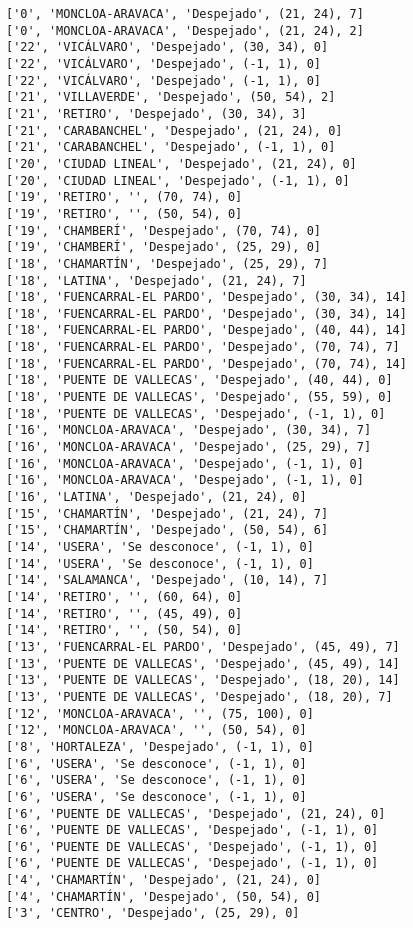 \documentclass[11pt]{article}
\begin{document}
\begin{Verbatim}[commandchars=\\\{\}]
['0', 'MONCLOA-ARAVACA', 'Despejado', (21, 24), 7]
['0', 'MONCLOA-ARAVACA', 'Despejado', (21, 24), 2]
['22', 'VICÁLVARO', 'Despejado', (30, 34), 0]
['22', 'VICÁLVARO', 'Despejado', (-1, 1), 0]
['22', 'VICÁLVARO', 'Despejado', (-1, 1), 0]
['21', 'VILLAVERDE', 'Despejado', (50, 54), 2]
['21', 'RETIRO', 'Despejado', (30, 34), 3]
['21', 'CARABANCHEL', 'Despejado', (21, 24), 0]
['21', 'CARABANCHEL', 'Despejado', (-1, 1), 0]
['20', 'CIUDAD LINEAL', 'Despejado', (21, 24), 0]
['20', 'CIUDAD LINEAL', 'Despejado', (-1, 1), 0]
['19', 'RETIRO', '', (70, 74), 0]
['19', 'RETIRO', '', (50, 54), 0]
['19', 'CHAMBERÍ', 'Despejado', (70, 74), 0]
['19', 'CHAMBERÍ', 'Despejado', (25, 29), 0]
['18', 'CHAMARTÍN', 'Despejado', (25, 29), 7]
['18', 'LATINA', 'Despejado', (21, 24), 7]
['18', 'FUENCARRAL-EL PARDO', 'Despejado', (30, 34), 14]
['18', 'FUENCARRAL-EL PARDO', 'Despejado', (30, 34), 14]
['18', 'FUENCARRAL-EL PARDO', 'Despejado', (40, 44), 14]
['18', 'FUENCARRAL-EL PARDO', 'Despejado', (70, 74), 7]
['18', 'FUENCARRAL-EL PARDO', 'Despejado', (70, 74), 14]
['18', 'PUENTE DE VALLECAS', 'Despejado', (40, 44), 0]
['18', 'PUENTE DE VALLECAS', 'Despejado', (55, 59), 0]
['18', 'PUENTE DE VALLECAS', 'Despejado', (-1, 1), 0]
['16', 'MONCLOA-ARAVACA', 'Despejado', (30, 34), 7]
['16', 'MONCLOA-ARAVACA', 'Despejado', (25, 29), 7]
['16', 'MONCLOA-ARAVACA', 'Despejado', (-1, 1), 0]
['16', 'MONCLOA-ARAVACA', 'Despejado', (-1, 1), 0]
['16', 'LATINA', 'Despejado', (21, 24), 0]
['15', 'CHAMARTÍN', 'Despejado', (21, 24), 7]
['15', 'CHAMARTÍN', 'Despejado', (50, 54), 6]
['14', 'USERA', 'Se desconoce', (-1, 1), 0]
['14', 'USERA', 'Se desconoce', (-1, 1), 0]
['14', 'SALAMANCA', 'Despejado', (10, 14), 7]
['14', 'RETIRO', '', (60, 64), 0]
['14', 'RETIRO', '', (45, 49), 0]
['14', 'RETIRO', '', (50, 54), 0]
['13', 'FUENCARRAL-EL PARDO', 'Despejado', (45, 49), 7]
['13', 'PUENTE DE VALLECAS', 'Despejado', (45, 49), 14]
['13', 'PUENTE DE VALLECAS', 'Despejado', (18, 20), 14]
['13', 'PUENTE DE VALLECAS', 'Despejado', (18, 20), 7]
['12', 'MONCLOA-ARAVACA', '', (75, 100), 0]
['12', 'MONCLOA-ARAVACA', '', (50, 54), 0]
['8', 'HORTALEZA', 'Despejado', (-1, 1), 0]
['6', 'USERA', 'Se desconoce', (-1, 1), 0]
['6', 'USERA', 'Se desconoce', (-1, 1), 0]
['6', 'USERA', 'Se desconoce', (-1, 1), 0]
['6', 'PUENTE DE VALLECAS', 'Despejado', (21, 24), 0]
['6', 'PUENTE DE VALLECAS', 'Despejado', (-1, 1), 0]
['6', 'PUENTE DE VALLECAS', 'Despejado', (-1, 1), 0]
['6', 'PUENTE DE VALLECAS', 'Despejado', (-1, 1), 0]
['4', 'CHAMARTÍN', 'Despejado', (21, 24), 0]
['4', 'CHAMARTÍN', 'Despejado', (50, 54), 0]
['3', 'CENTRO', 'Despejado', (25, 29), 0]

\end{Verbatim}
\end{document}
